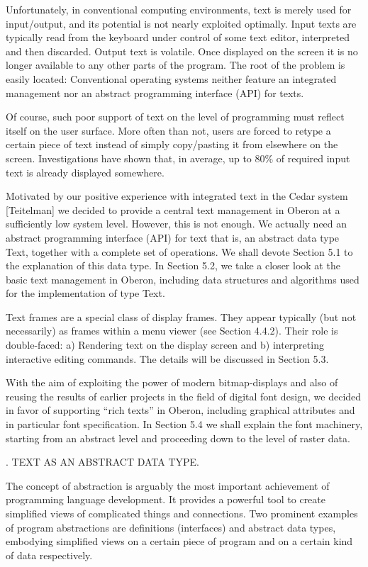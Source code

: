 Unfortunately, in conventional computing environments, text is merely
used for input/output, and its potential is not nearly exploited
optimally. Input texts are typically read from the keyboard under
control of some text editor, interpreted and then discarded. Output
text is volatile. Once displayed on the screen it is no longer
available to any other parts of the program. The root of the problem
is easily located: Conventional operating systems neither feature an
integrated management nor an abstract programming interface (API) for
texts.

Of course, such poor support of text on the level of programming must
reflect itself on the user surface. More often than not, users are
forced to retype a certain piece of text instead of simply
copy/pasting it from elsewhere on the screen. Investigations have
shown that, in average, up to 80\% of required input text is already
displayed somewhere.

Motivated by our positive experience with integrated text in the Cedar
system [Teitelman] we decided to provide a central text management in
Oberon at a sufficiently low system level. However, this is not
enough. We actually need an abstract programming interface (API) for
text that is, an abstract data type Text, together with a complete set
of operations. We shall devote Section 5.1 to the explanation of this
data type. In Section 5.2, we take a closer look at the basic text
management in Oberon, including data structures and algorithms used
for the implementation of type Text.

Text frames are a special class of display frames. They appear
typically (but not necessarily) as frames within a menu viewer (see
Section 4.4.2). Their role is double-faced: a) Rendering text on the
display screen and b) interpreting interactive editing commands. The
details will be discussed in Section 5.3.

With the aim of exploiting the power of modern bitmap-displays and
also of reusing the results of earlier projects in the field of
digital font design, we decided in favor of supporting ``rich texts'' in
Oberon, including graphical attributes and in particular font
specification. In Section 5.4 we shall explain the font machinery,
starting from an abstract level and proceeding down to the level of
raster data.

. TEXT AS AN ABSTRACT DATA TYPE.

The concept of abstraction is arguably the most important achievement
of programming language development. It provides a powerful tool to
create simplified views of complicated things and connections. Two
prominent examples of program abstractions are definitions
(interfaces) and abstract data types, embodying simplified views on a
certain piece of program and on a certain kind of data respectively.

